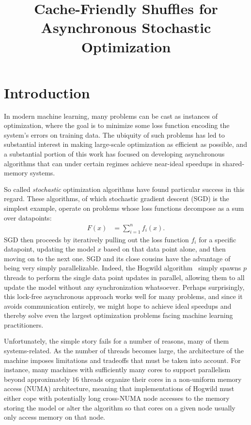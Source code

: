 \documentclass[times,11pt]{article}
\numberwithin{equation}{section}		%
\numberwithin{figure}{section}			%
\numberwithin{table}{section}				%
\begin{document}
\title{Cache-Friendly Shuffles for Asynchronous Stochastic Optimization}

\maketitle
\section{Introduction}

In modern machine learning, many problems can be cast as instances of optimization, where the goal is to minimize some loss
function encoding the system's errors on training data. The ubiquity of such problems has led to substantial interest in making large-scale
optimization as efficient as possible, and a substantial portion of this work has focused on developing asynchronous algorithms that can under certain regimes
achieve near-ideal speedups in shared-memory systems.

So called {\it stochastic} optimization algorithms have found particular success in this regard. These algorithms, of which stochastic gradient descent (SGD) is the simplest example, operate
on problems whose loss functions decompose as a sum over datapoints:
\begin{align*}
F\left(x\right) & = \sum_{i = 1}^{n} f_{i}\left(x\right) .
\end{align*}
SGD then proceeds by iteratively pulling out the loss function $f_{i}$ for a specific datapoint, updating the model $x$ based on that data point alone, and then moving on to the next one.
SGD and its close cousins have the advantage of being very simply parallelizable. Indeed, the Hogwild algorithm~\citep{} simply spawns $p$ threads to perform the single data point updates in parallel,
allowing them to all update the model without any synchronization whatsoever. Perhaps surprisingly, this lock-free asynchronous approach works well for many problems, and since it avoids communication entirely,
we might hope to achieve ideal speedups and thereby solve even the largest optimization problems facing machine learning practitioners.


Unfortunately, the simple story fails for a number of reasons, many of them systems-related. As the number of threads becomes large, the architecture of the machine
imposes limitations and tradeoffs that must be taken into account. For instance, many machines with sufficiently many cores to support parallelism beyond approximately $16$
threads organize their cores in a non-uniform memory access (NUMA) architecture, meaning that implementations of Hogwild must either cope with potentially long cross-NUMA node
accesses to the memory storing the model or alter the algorithm so that cores on a given node usually only access memory on that node.
\end{document}
